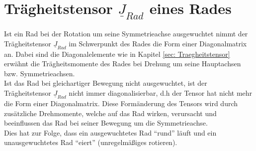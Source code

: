 

\section{Trägheitstensor $\underline{J}_{Rad}$ eines Rades}
\label{sec: Rad}

Ist ein Rad bei der Rotation um seine Symmetrieachse ausgewuchtet nimmt der Trägheitstensor $\underline{J}_{Rad}$ im Schwerpunkt des Rades die Form einer Diagonalmatrix an. Dabei sind die Diagonalelemente wie in Kapitel \ref{sec: Traegheitstensor} erwähnt die Trägheitsmomente des Rades bei Drehung um seine Hauptachsen bzw. Symmetrieachsen. \\
Ist das Rad bei gleichartiger Bewegung nicht ausgewuchtet, ist der Trägheitstensor $\underline{J}_{Rad}$ nicht immer diagonalisierbar, d.h der Tensor hat nicht mehr die Form einer Diagonalmatrix. Diese Formänderung des Tensors wird durch zusätzliche Drehmomente, welche auf das Rad wirken, verursacht und beeinflussen das Rad bei seiner Bewegung um die Symmetrieachse. \\
Dies hat zur Folge, dass ein ausgewuchtetes Rad \enquote{rund} läuft und ein unausgewuchtetes Rad \enquote{eiert} (unregelmäßiges rotieren).